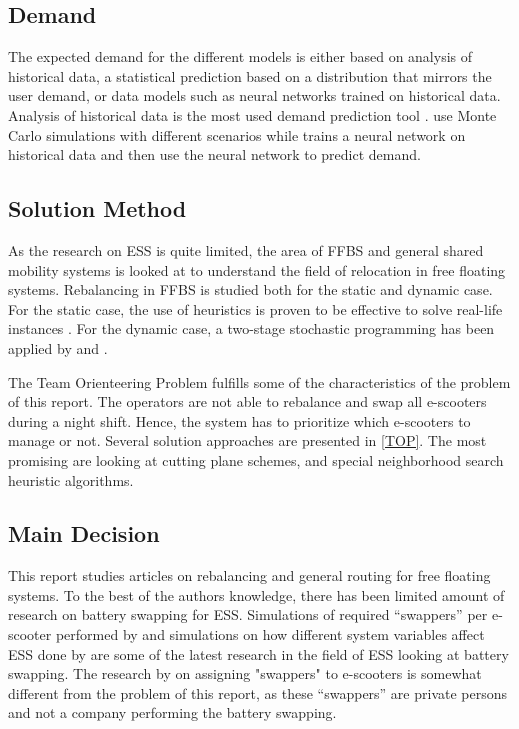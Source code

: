 \subsection{Demand}\label{comparison_demand}

The expected demand for the different models is either based on analysis of historical data, a statistical prediction based on a distribution that mirrors the user demand, or data models such as neural networks trained on historical data. Analysis of historical data is the most used demand prediction tool  \citep{pal_free-floating_2017, du_static_2020, liu_static_2018, pender_stochastic_2020, masoud_heuristic_2019, fosen_rebalancing_2020}. \citet{warrington_two-stage_2019} use Monte Carlo simulations with different scenarios while  \citet{caggiani_modeling_2018} trains a neural network on historical data and then use the neural network to predict demand.

\subsection{Solution Method}\label{comparison_modl_meth}

As the research on ESS is quite limited, the area of FFBS and general shared mobility systems is looked at to understand the field of relocation in free floating systems. Rebalancing in FFBS is studied both for the static and dynamic case. For the static case, the use of heuristics is proven to be effective to solve real-life instances \citep{pal_free-floating_2017, du_static_2020, liu_static_2018}. For the dynamic case, a two-stage stochastic programming has been applied by \citet{pal_free-floating_2017} and \citet{fosen_rebalancing_2020}. 

The Team Orienteering Problem fulfills some of the characteristics of the problem of this report. The operators are not able to rebalance and swap all e-scooters during a night shift. Hence, the system has to prioritize which e-scooters to manage or not. Several solution approaches are presented in \cref{TOP}. The most promising are looking at cutting plane schemes, and special neighborhood search heuristic algorithms.

\subsection{Main Decision}\label{comparison_main_decision}

This report studies articles on rebalancing and general routing for free floating systems. To the best of the authors knowledge, there has been limited amount of research on battery swapping for ESS. Simulations of required “swappers” per e-scooter performed by \citet{pender_stochastic_2020} and simulations on how different system variables affect ESS done by \citet{ciociola_e-scooter_2020} are some of the latest research in the field of ESS looking at battery swapping. The research by \citet{masoud_heuristic_2019} on assigning "swappers" to e-scooters is somewhat different from the problem of this report, as these “swappers” are private persons and not a company performing the battery swapping. 


